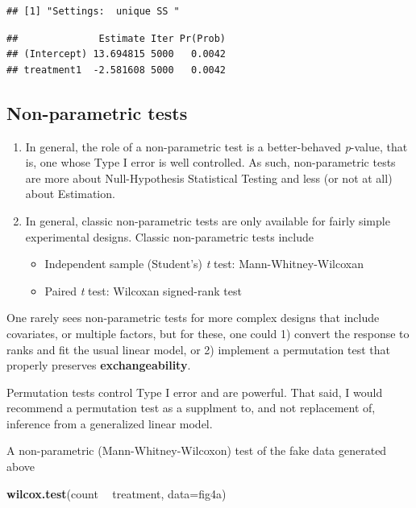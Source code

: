 \documentclass[]{book}
\newenvironment{Shaded}{\begin{snugshade}}{\end{snugshade}}
\newcommand{\KeywordTok}[1]{\textcolor[rgb]{0.13,0.29,0.53}{\textbf{#1}}}
\newcommand{\DataTypeTok}[1]{\textcolor[rgb]{0.13,0.29,0.53}{#1}}
\newcommand{\StringTok}[1]{\textcolor[rgb]{0.31,0.60,0.02}{#1}}
\newcommand{\OperatorTok}[1]{\textcolor[rgb]{0.81,0.36,0.00}{\textbf{#1}}}
\newcommand{\NormalTok}[1]{#1}
\providecommand{\tightlist}{%
  \setlength{\itemsep}{0pt}\setlength{\parskip}{0pt}}
\begin{document}
\begin{verbatim}
## [1] "Settings:  unique SS "
\end{verbatim}

\begin{verbatim}
##              Estimate Iter Pr(Prob)
## (Intercept) 13.694815 5000   0.0042
## treatment1  -2.581608 5000   0.0042
\end{verbatim}

\subsection{Non-parametric tests}\label{non-parametric-tests}

\begin{enumerate}
\def\labelenumi{\arabic{enumi}.}
\tightlist
\item
  In general, the role of a non-parametric test is a better-behaved
  \emph{p}-value, that is, one whose Type I error is well controlled. As
  such, non-parametric tests are more about Null-Hypothesis Statistical
  Testing and less (or not at all) about Estimation.
\item
  In general, classic non-parametric tests are only available for fairly
  simple experimental designs. Classic non-parametric tests include

  \begin{itemize}
  \tightlist
  \item
    Independent sample (Student's) \emph{t} test: Mann-Whitney-Wilcoxan
  \item
    Paired \emph{t} test: Wilcoxan signed-rank test
  \end{itemize}
\end{enumerate}

One rarely sees non-parametric tests for more complex designs that
include covariates, or multiple factors, but for these, one could 1)
convert the response to ranks and fit the usual linear model, or 2)
implement a permutation test that properly preserves
\textbf{exchangeability}.

Permutation tests control Type I error and are powerful. That said, I
would recommend a permutation test as a supplment to, and not
replacement of, inference from a generalized linear model.

A non-parametric (Mann-Whitney-Wilcoxon) test of the fake data generated
above

\begin{Shaded}
\begin{Highlighting}[]
\KeywordTok{wilcox.test}\NormalTok{(count }\OperatorTok{~}\StringTok{ }\NormalTok{treatment, }\DataTypeTok{data=}\NormalTok{fig4a)}
\end{Highlighting}
\end{Shaded}
\end{document}
